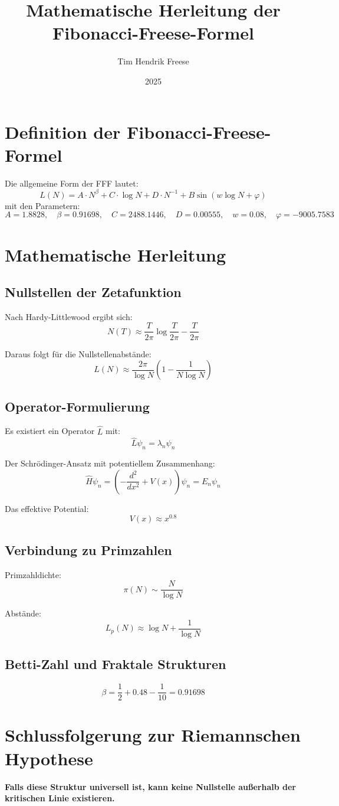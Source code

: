 \documentclass{article}
\begin{document}
\title{Mathematische Herleitung der Fibonacci-Freese-Formel}
\author{Tim Hendrik Freese}
\date{2025}
\maketitle

\section{Definition der Fibonacci-Freese-Formel}
Die allgemeine Form der FFF lautet:
\[
L(N) = A \cdot N^\beta + C \cdot \log N + D \cdot N^{-1} + B \sin(w \log N + \varphi)
\]
mit den Parametern:
\[
A = 1.8828, \quad \beta = 0.91698, \quad C = 2488.1446, \quad D = 0.00555, \quad w = 0.08, \quad \varphi = -9005.7583
\]

\section{Mathematische Herleitung}
\subsection{Nullstellen der Zetafunktion}
Nach Hardy-Littlewood ergibt sich:
\[
N(T) \approx \frac{T}{2\pi} \log \frac{T}{2\pi} - \frac{T}{2\pi}
\]

Daraus folgt für die Nullstellenabstände:
\[
L(N) \approx \frac{2\pi}{\log N} \left(1 - \frac{1}{N \log N}\right)
\]

\subsection{Operator-Formulierung}
Es existiert ein Operator \( \hat{L} \) mit:
\[
\hat{L} \psi_n = \lambda_n \psi_n
\]

Der Schrödinger-Ansatz mit potentiellem Zusammenhang:
\[
\hat{H} \psi_n = \left( -\frac{d^2}{dx^2} + V(x) \right) \psi_n = E_n \psi_n
\]

Das effektive Potential:
\[
V(x) \approx x^{0.8}
\]

\subsection{Verbindung zu Primzahlen}
Primzahldichte:
\[
\pi(N) \sim \frac{N}{\log N}
\]

Abstände:
\[
L_p(N) \approx \log N + \frac{1}{\log N}
\]

\subsection{Betti-Zahl und Fraktale Strukturen}
\[
\beta = \frac{1}{2} + 0.48 - \frac{1}{10} = 0.91698
\]

\section{Schlussfolgerung zur Riemannschen Hypothese}
\textbf{Falls diese Struktur universell ist, kann keine Nullstelle außerhalb der kritischen Linie existieren.}
\end{document}
